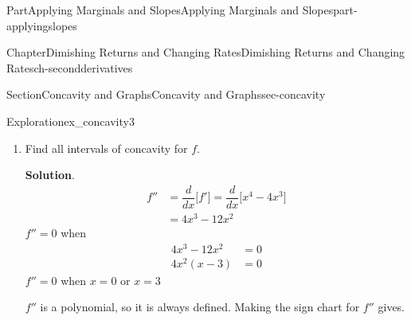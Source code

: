\documentclass[oneside,10pt,]{tufte-book}
\newcommand{\blocktitlefont}{\relax}
\numberwithin{equation}{chapter}
\newcommand{\ddx}[1]{ \dfrac{d}{dx} \Big[ #1 \Big]  }
\newcommand{\amp}{&}
\begin{document}
\begin{partptx}{Part}{Applying Marginals and Slopes}{}{Applying Marginals and Slopes}{}{}{part-applyingslopes}
\begin{chapterptx}{Chapter}{Dimishing Returns and Changing Rates}{}{Dimishing Returns and Changing Rates}{}{}{ch-secondderivatives}
\begin{sectionptx}{Section}{Concavity and Graphs}{}{Concavity and Graphs}{}{}{sec-concavity}
\begin{exploration}{Exploration}{}{ex_concavity3}
\begin{enumerate}[font=\bfseries,label=(\alph*),ref=\alph*]
\begin{image}{0.25}{0.5}{0.25}{}
{
}%
\end{image}%
 \(f\) has a local maximum at \(x=0\), and a local mininmum at \(x=4\).%
\item{}Find all intervals of concavity for \(f\).%
\par\smallskip%
\noindent\textbf{\blocktitlefont Solution}.\hypertarget{ex_concavity3-3-2}{}\quad{}%
\begin{align*}
f'' \amp = \ddx{f'} = \ddx{x^4 - 4x^3} \\
\amp = 4x^3-12x^2
\end{align*}
\(f''=0\) when%
\begin{align*}
4x^3 -12x^2 \amp = 0\\
4x^2( x - 3)\amp = 0 
\end{align*}
\(f''=0\) when \(x=0\) or \(x=3\)%
\par
\(f''\) is a polynomial, so it is always defined.  Making the sign chart for \(f''\) gives. \begin{image}{0.25}{0.5}{0.25}{}%
%
\end{image}%

\end{enumerate}
\end{exploration}
\end{sectionptx}
\end{chapterptx}
\end{partptx}
\end{document}

